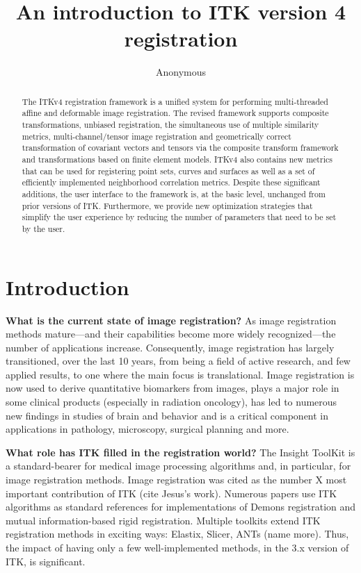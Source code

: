 \documentclass{article}
\begin{document}
\vspace{-0.1in}
\title{An introduction to ITK version 4 registration}
\author{Anonymous}
\maketitle              
\begin{abstract}
The ITKv4 registration framework is a unified system for performing
multi-threaded affine and deformable image registration.  The revised
framework supports composite transformations, unbiased registration,
the simultaneous use of multiple similarity metrics,
multi-channel/tensor image registration and geometrically correct
transformation of covariant vectors and tensors via the composite
transform framework and transformations based on finite element
models.  ITKv4 also contains new metrics that can be used for
registering point sets, curves and surfaces as well as a set of
efficiently implemented neighborhood correlation metrics.  Despite
these significant additions, the user interface to the framework is,
at the basic level, unchanged from prior versions of ITK.
Furthermore, we provide new optimization strategies that simplify the
user experience by reducing the number of parameters that need to be
set by the user.
\end{abstract}

\section{Introduction}
{\bf What is the current state of image registration?}  As image
registration methods mature---and their capabilities become more
widely recognized---the number of applications increase.
Consequently, image registration has largely transitioned, over the
last 10 years, from being a field of active research, and few applied
results, to one where the main focus is translational.  Image
registration is now used to derive quantitative biomarkers from
images, plays a major role in some clinical products (especially in
radiation oncology), has led to numerous new findings in studies of
brain and behavior and is a critical component in applications in
pathology, microscopy, surgical planning and more.


{\bf What role has ITK filled in the registration world?}  The Insight
ToolKit is a standard-bearer for medical image processing algorithms
and, in particular, for image registration methods.  Image
registration was cited as the number X most important contribution of
ITK (cite Jesus's work).  Numerous papers use ITK algorithms as
standard references for implementations of Demons registration and mutual
information-based rigid registration.  Multiple toolkits extend ITK
registration methods in exciting ways:  Elastix, Slicer, ANTs (name
more).  Thus, the impact of having only a few well-implemented
methods, in the 3.x version of ITK, is significant.  
\end{document}
